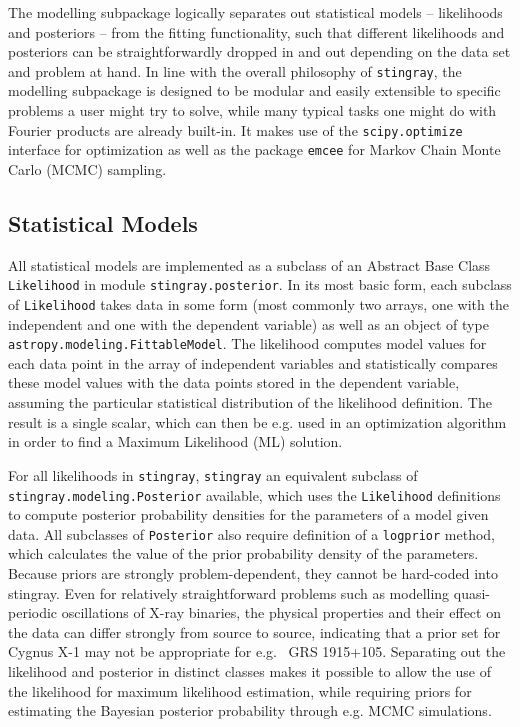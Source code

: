 \documentclass[twocolumn]{aastex62}
\newcommand{\stingray}{\texttt{stingray}\xspace}
\newcommand{\likelihood}{\texttt{Likelihood}\xspace}
\begin{document}
The modelling subpackage logically separates out statistical models -- likelihoods and posteriors -- from the fitting functionality, such that different likelihoods and posteriors can be straightforwardly dropped in and out depending on the data set and problem at hand.%
In line with the overall philosophy of \stingray, the modelling subpackage is designed to be modular and easily extensible to specific problems a user might try to solve, while many typical tasks one might do with Fourier products are already built-in. It makes use of the \verb|scipy.optimize| interface for optimization as well as the package \texttt{emcee} for Markov Chain Monte Carlo (MCMC) sampling.

\subsection{Statistical Models}

All statistical models are implemented as a subclass of an Abstract Base Class \likelihood in module \verb|stingray.posterior|. In its most basic form, each subclass of \likelihood takes data in some form (most commonly two arrays, one with the independent and one with the dependent variable) as well as an object of type \verb|astropy.modeling.FittableModel|. The likelihood computes model values for each data point in the array of independent variables and statistically compares these model values with the data points stored in the dependent variable, assuming the particular statistical distribution of the likelihood definition. The result is a single scalar, which can then be e.g. used in an optimization algorithm in order to find a Maximum Likelihood (ML) solution.

For all likelihoods in \stingray, \stingray an equivalent subclass of \verb|stingray.modeling.Posterior| available, which uses the \likelihood definitions to compute posterior probability densities for the parameters of a model given data. All subclasses of \verb|Posterior| also require definition of a \texttt{logprior} method, which calculates the value of the prior probability density of the parameters. Because priors are strongly problem-dependent, they cannot be hard-coded into stingray. Even for relatively straightforward problems such as modelling quasi-periodic oscillations of X-ray binaries, the physical properties and their effect on the data can differ strongly from source to source, indicating that a prior set for Cygnus X-1 may not be appropriate for e.g.~ GRS 1915+105. Separating out the likelihood and posterior in distinct classes makes it possible to allow the use of the likelihood for maximum likelihood estimation, while requiring priors for estimating the Bayesian posterior probability through e.g. MCMC simulations.
\end{document}
